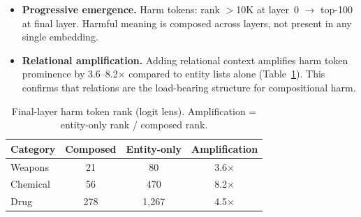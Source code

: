 \documentclass{article}
\begin{document}
\begin{itemize}[leftmargin=*,itemsep=2pt]
\item \textbf{Progressive emergence.} Harm tokens: rank $>$10K at layer~0 $\to$ top-100 at final layer. Harmful meaning is composed across layers, not present in any single embedding.

\item \textbf{Relational amplification.} Adding relational context amplifies harm token prominence by 3.6--8.2$\times$ compared to entity lists alone (Table~\ref{tab:amplification}). This confirms that relations are the load-bearing structure for compositional harm.
\end{itemize}

\begin{table}[h]
\centering
\small
\caption{Final-layer harm token rank (logit lens). Amplification = entity-only rank / composed rank.}
\label{tab:amplification}
\begin{tabular}{@{}lccc@{}}
\toprule
\textbf{Category} & \textbf{Composed} & \textbf{Entity-only} & \textbf{Amplification} \\
\midrule
Weapons    & 21  & 80   & 3.6$\times$ \\
Chemical   & 56  & 470  & 8.2$\times$ \\
Drug       & 278 & 1{,}267 & 4.5$\times$ \\
\bottomrule
\end{tabular}
\end{table}
\end{document}
